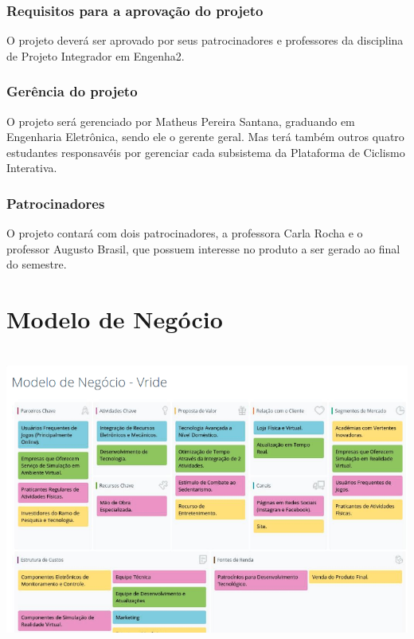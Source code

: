 \begin{apendicesenv}
\subsection{Requisitos para a aprovação do projeto}

O projeto deverá ser aprovado por seus patrocinadores e professores da disciplina de Projeto Integrador em Engenha2.

\subsection{Gerência do projeto}

O projeto será gerenciado por Matheus Pereira Santana, graduando em Engenharia Eletrônica, sendo ele o gerente geral. Mas terá também outros quatro estudantes responsavéis por gerenciar cada subsistema da Plataforma de Ciclismo Interativa.

\subsection{Patrocinadores}

O projeto contará com dois patrocinadores, a professora Carla Rocha e o professor Augusto Brasil, que possuem interesse no produto a ser gerado ao final do semestre. 

\chapter{Modelo de Negócio}

\begin{center}
    \includegraphics[scale=0.5]{figuras/canvas}
       \label{canvas}
   \end{center}  


\end{apendicesenv}
